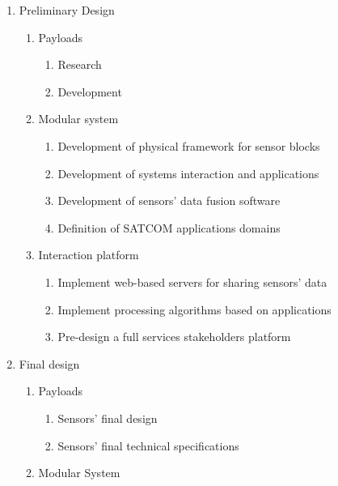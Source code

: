 \begin{enumerate}[label*=\arabic*.]
	\begin{enumerate}[label*=\arabic*.]
		\item Preliminary Design
		\begin{enumerate}[label*=\arabic*.]
			\item Payloads
			\begin{enumerate}[label*=\arabic*.]
				\item Research
				\item Development
			\end{enumerate}
			\item Modular system
			\begin{enumerate}[label*=\arabic*.]
				\item Development of physical framework for sensor blocks
				\item Development of systems interaction and applications
				\item Development of sensors' data fusion software
				\item Definition of SATCOM applications domains
			\end{enumerate}
			\item Interaction platform
			\begin{enumerate}[label*=\arabic*.]
				\item Implement web-based servers for sharing sensors' data
				\item Implement processing algorithms based on applications
				\item Pre-design a full services stakeholders platform 
			\end{enumerate}
		\end{enumerate}
		\item Final design
		\begin{enumerate}[label*=\arabic*.]
			\item Payloads 
			\begin{enumerate}[label*=\arabic*.]
				\item Sensors' final design
				\item Sensors' final technical specifications
			\end{enumerate}
			\item Modular System

\end{enumerate}
\end{enumerate}
\end{enumerate}
